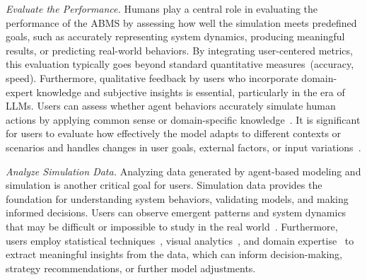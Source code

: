 \textit{Evaluate the Performance.}
Humans play a central role in evaluating the performance of the ABMS by assessing how well the simulation meets predefined goals, such as accurately representing system dynamics, producing meaningful results, or predicting real-world behaviors.
By integrating user-centered metrics, this evaluation typically goes beyond standard quantitative measures~(\eg accuracy, speed).
Furthermore, qualitative feedback by users who incorporate domain-expert knowledge and subjective insights is essential, particularly in the era of LLMs.
Users can assess whether agent behaviors accurately simulate human actions by applying common sense or domain-specific knowledge~\cite{10.1145/3526113.3545616,10.1145/3613905.3651026,wang2023humanoidagentsplatformsimulating}.
It is significant for users to evaluate how effectively the model adapts to different contexts or scenarios and handles changes in user goals, external factors, or input variations~\cite{10.1145/3613905.3651008,10.1145/3613904.3642947}.

\textit{Analyze Simulation Data.}
Analyzing data generated by agent-based modeling and simulation is another critical goal for users.
Simulation data provides the foundation for understanding system behaviors, validating models, and making informed decisions.
Users can observe emergent patterns and system dynamics that may be difficult or impossible to study in the real world~\cite{berryman2008review}.
Furthermore, users employ statistical techniques~\cite{netlogo}, visual analytics~\cite{pan2024agentcoordvisuallyexploringcoordination,10520238}, and domain expertise~\cite{electronics12122722} to extract meaningful insights from the data, which can inform decision-making, strategy recommendations, or further model adjustments. 


